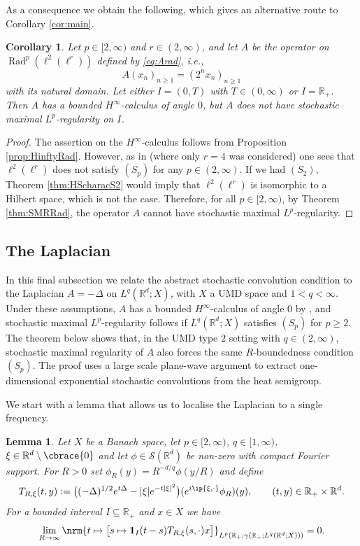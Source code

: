 \documentclass{amsart}
\let\geq\geqslant
\theoremstyle{plain}
\theoremstyle{remark}
\theoremstyle{plain}
\newtheorem{corollary}[theorem]{Corollary}
\newtheorem{lemma}[theorem]{Lemma}
\numberwithin{equation}{section}
\newcommand{\R}{\mathbb R}
\newcommand{\1}{\mathbf 1}
\newcommand{\Rad}{\operatorname{Rad}}
\newcommand{\mc}{\mathcal}
\DeclarePairedDelimiter\cbrace\{\}
\DeclarePairedDelimiter{\ip}\langle\rangle
\DeclarePairedDelimiter{\nrm}\lVert\rVert
\newcommand{\brb}[1]{\bigl(#1\bigr)}
\newcommand{\bracb}[1]{\bigl[#1\bigr]}
\begin{document}
As a consequence we obtain the following, which  gives an alternative route to Corollary \ref{cor:main}.

\begin{corollary}\label{cor:noSMR}
Let $p\in [2, \infty)$ and $r\in (2, \infty)$, and let $A$ be the operator on $\Rad^p(\ell^{2}(\ell^r))$ defined by \eqref{eq:Arad}, i.e.,
\begin{equation*}
A (x_n)_{n\geq 1} = (2^n x_n)_{n\geq 1}
\end{equation*}
with its natural domain. Let either $I= (0,T)$ with $T\in (0,\infty)$ or $I = \R_+$. Then $A$ has a bounded $H^\infty$-calculus of angle $0$, but $A$ does not have stochastic maximal $L^p$-regularity on $I$.
\end{corollary}

 \begin{proof}
 The assertion on the $H^\infty$-calculus follows from Proposition \ref{prop:HinftyRad}. However, as in \cite[Theorem 8.2]{NVW-Rbounded} (where only $r=4$ was considered)
 one sees that $\ell^{2}(\ell^r)$ does not satisfy $(S_p)$ for any $p\in (2,\infty)$.
 If we had $(S_2)$, Theorem \ref{thm:HScharacS2} would imply that $\ell^2(\ell^r)$ is isomorphic to a Hilbert space, which is not the case. Therefore, for all $p\in [2,\infty)$, by Theorem \ref{thm:SMRRad}, the operator $A$ cannot have stochastic maximal $L^p$-regularity.
 \end{proof}



\subsection{The Laplacian}\label{ss:Laplace}
In this final subsection we relate the abstract stochastic convolution condition to the Laplacian $A = -\Delta$ on $L^q(\mathbb R^d;X)$, with $X$ a UMD space and $1<q<\infty$. Under these assumptions, $A$ has a bounded $H^\infty$-calculus of  angle $0$ by \cite[Theorem 10.2.25]{HNVW2},
and stochastic maximal $L^p$-regularity follows if $L^q(\mathbb R^d;X)$ satisfies $(S_p)$ for $p \geq 2 $. The theorem below shows that, in the UMD type $2$ setting with $q\in (2,\infty)$, stochastic maximal regularity of $A$ also forces the same $R$-boundedness condition $(S_p)$. The proof uses a large scale plane-wave argument to extract one-dimensional exponential stochastic convolutions from the heat semigroup.

We start with a lemma that allows us to localise the Laplacian to a single frequency.
\begin{lemma}
\label{lem:large-scale-plane-waves}
Let $X$ be a Banach space, let $p\in[2,\infty)$,
$q\in[1,\infty)$, $\xi \in \R^d\setminus\cbrace{0}$ and let
$\phi\in\mc S(\R^d)$ be non-zero with compact Fourier support.  For
$R>0$ set
$
  \phi_R(y)=R^{-d/q}\phi(y/R)
$
and
define
\[
  T_{R,\xi}(t,y)
  :=
  \brb{(-\Delta)^{1/2}e^{t\Delta}-|\xi|e^{-t|\xi|^2}}(e^{i \ip{\xi,\cdot} }\phi_R)(y), \qquad (t,y) \in \R_+\times \R^d.
\]
For a bounded interval $I \subseteq \R_+$ and $x \in X$ we have
\[
  \lim_{R\to\infty}
  \nrm{
    t\mapsto
    \bracb{
      s\mapsto
      \1_I(t-s) T_{R,\xi}(s,\cdot)x
    }
  }_{L^p(\R_+;\gamma(\R_+;L^q(\R^d;X)))}
  =
  0.
\]
\end{lemma}
\end{document}
